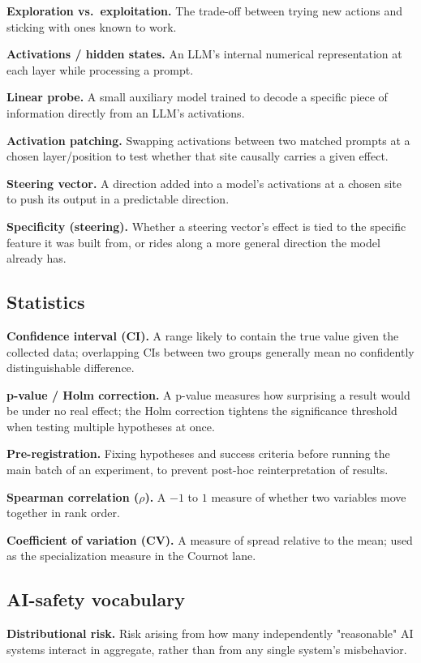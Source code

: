 \documentclass[11pt]{article}
\begin{document}
\textbf{Exploration vs.\ exploitation.} The trade-off between trying new actions and sticking with ones known to work.

\textbf{Activations / hidden states.} An LLM's internal numerical representation at each layer while processing a prompt.

\textbf{Linear probe.} A small auxiliary model trained to decode a specific piece of information directly from an LLM's activations.

\textbf{Activation patching.} Swapping activations between two matched prompts at a chosen layer/position to test whether that site causally carries a given effect.

\textbf{Steering vector.} A direction added into a model's activations at a chosen site to push its output in a predictable direction.

\textbf{Specificity (steering).} Whether a steering vector's effect is tied to the specific feature it was built from, or rides along a more general direction the model already has.

\subsection*{Statistics}
\textbf{Confidence interval (CI).} A range likely to contain the true value given the collected data; overlapping CIs between two groups generally mean no confidently distinguishable difference.

\textbf{p-value / Holm correction.} A p-value measures how surprising a result would be under no real effect; the Holm correction tightens the significance threshold when testing multiple hypotheses at once.

\textbf{Pre-registration.} Fixing hypotheses and success criteria before running the main batch of an experiment, to prevent post-hoc reinterpretation of results.

\textbf{Spearman correlation ($\rho$).} A $-1$ to $1$ measure of whether two variables move together in rank order.

\textbf{Coefficient of variation (CV).} A measure of spread relative to the mean; used as the specialization measure in the Cournot lane.

\subsection*{AI-safety vocabulary}
\textbf{Distributional risk.} Risk arising from how many independently "reasonable" AI systems interact in aggregate, rather than from any single system's misbehavior.
\end{document}
